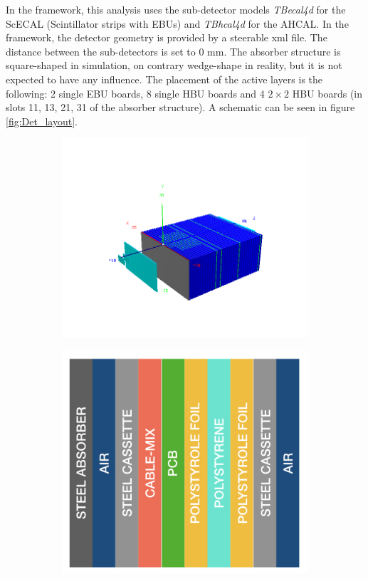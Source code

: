 In the \mokka framework, this analysis uses the sub-detector models \textit{TBecal4d} for the ScECAL (Scintillator strips with EBUs) and \textit{TBhcal4d} for the AHCAL. In the \ddhep framework, the detector geometry is provided by a steerable xml file. The distance between the sub-detectors is set to 0 mm. The absorber structure is square-shaped in simulation, on contrary wedge-shape in reality, but it is not expected to have any influence. The placement of the active layers is the following: 2 single EBU boards, 8 single HBU boards and 4 $2\times2$ HBU boards (in slots 11, 13, 21, 31 of the absorber structure). A schematic can be seen in figure \ref{fig:Det_layout}.
\begin{figure}[htbp!]
  \centering
  \begin{subfigure}[t]{0.59\textwidth}
    \includegraphics[width=1.\linewidth]{chap4/fig/DD4hep_AHCALModel.png}
    \caption{} \label{fig:GeomModel}
  \end{subfigure}
  \hfill
  \begin{subfigure}[t]{0.39\textwidth}
    \includegraphics[width=1.\linewidth]{chap4/fig/Structure.jpeg}

\end{subfigure}
\end{figure}
